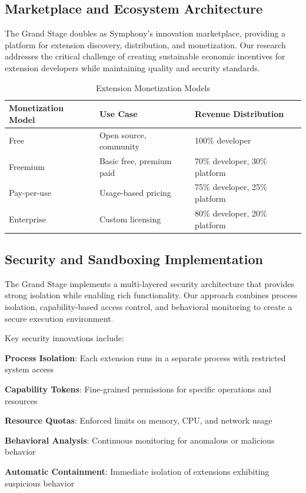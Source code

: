 \subsection*{Marketplace and Ecosystem Architecture}

The Grand Stage doubles as Symphony's innovation marketplace, providing a platform for extension discovery, distribution, and monetization. Our research addresses the critical challenge of creating sustainable economic incentives for extension developers while maintaining quality and security standards.

\begin{table}[ht]
\centering
\begin{tabular}{@{}lll@{}}
\toprule
\textbf{Monetization Model} & \textbf{Use Case} & \textbf{Revenue Distribution} \\
\midrule
Free & Open source, community & 100\% developer \\
Freemium & Basic free, premium paid & 70\% developer, 30\% platform \\
Pay-per-use & Usage-based pricing & 75\% developer, 25\% platform \\
Enterprise & Custom licensing & 80\% developer, 20\% platform \\
\bottomrule
\end{tabular}
\caption{Extension Monetization Models}
\end{table}

\subsection*{Security and Sandboxing Implementation}

The Grand Stage implements a multi-layered security architecture that provides strong isolation while enabling rich functionality. Our approach combines process isolation, capability-based access control, and behavioral monitoring to create a secure execution environment.

Key security innovations include:

\begin{compactlist}
    \item \textbf{Process Isolation}: Each extension runs in a separate process with restricted system access
    \item \textbf{Capability Tokens}: Fine-grained permissions for specific operations and resources
    \item \textbf{Resource Quotas}: Enforced limits on memory, CPU, and network usage
    \item \textbf{Behavioral Analysis}: Continuous monitoring for anomalous or malicious behavior
    \item \textbf{Automatic Containment}: Immediate isolation of extensions exhibiting suspicious behavior
\end{compactlist}

